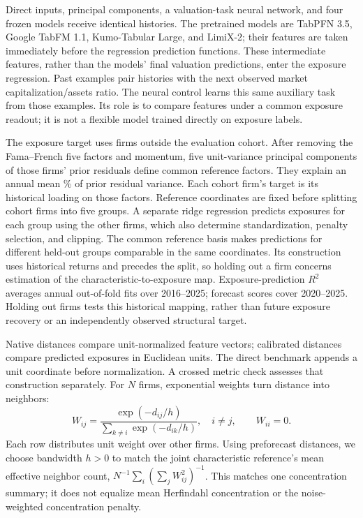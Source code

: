 \documentclass[11pt]{article}
\begin{document}
Direct inputs, principal components, a valuation-task neural network, and four
frozen models receive identical histories. The pretrained models are TabPFN
3.5, Google TabFM 1.1, Kumo-Tabular Large, and LimiX-2; their features are taken
immediately before the regression prediction functions. These
intermediate features, rather than
the models' final valuation predictions, enter the exposure
regression. Past examples pair
histories with the next observed market capitalization/assets ratio. The neural
control learns this same auxiliary task from those examples. Its role is to
compare features under a common exposure readout; it is not a flexible model
trained directly on exposure labels.

The exposure target uses firms outside the evaluation cohort. After removing
the Fama--French %
five factors and momentum, five unit-variance principal components of those
firms' prior residuals define common reference factors. They explain an annual
mean \TargetCommonality\% of prior residual variance. Each cohort firm's target
is its historical loading on those factors. Reference coordinates are fixed
before splitting cohort firms into five groups. A separate ridge regression
predicts exposures for each group using the other firms, which also determine
standardization, penalty selection, and clipping. The common
reference basis makes predictions for different held-out groups
comparable in the same coordinates. Its construction uses historical returns
and precedes the split, so holding out a firm concerns estimation of the
characteristic-to-exposure map. Exposure-prediction $R^2$
averages annual out-of-fold fits over 2016--2025; forecast scores cover
2020--2025. Holding out firms tests this historical mapping, rather than future
exposure recovery or an independently observed structural target.

Native distances compare unit-normalized feature vectors; calibrated distances
compare predicted exposures in Euclidean units. The direct benchmark appends a
unit coordinate before normalization. A crossed metric check assesses that
construction separately. For $N$ firms, exponential weights turn distance into
neighbors:
\begin{equation}\label{eq:weights}
  W_{ij}=\frac{\exp(-d_{ij}/h)}{\sum_{k\ne i}\exp(-d_{ik}/h)},\quad i\ne j,
  \qquad W_{ii}=0.
\end{equation}
Each row distributes unit weight over other firms. Using preforecast distances,
we choose bandwidth $h>0$ to match the joint characteristic reference's mean
effective neighbor count,
$N^{-1}\sum_i{(\sum_j W_{ij}^2)}^{-1}$.
This matches one concentration summary; it does not equalize mean Herfindahl
concentration or the noise-weighted concentration penalty.
\end{document}

